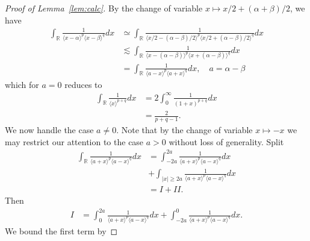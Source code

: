 \documentclass[12pt,reqno]{amsart}
\numberwithin{equation}{section}  %
\numberwithin{figure}{section}
\newcommand{\rr}{\mathbb{R}}
\begin{document}
\begin{proof}[Proof of Lemma~\ref{lem:calc}]
%
By the change of variable $x \mapsto x/2 + (\alpha + \beta)/2$, we have
%
%
\begin{equation}
  \label{rry}
	\begin{split}
    \int_{\rr} \frac{1}{\langle x - \alpha \rangle^{p} \langle  x -
    \beta
    \rangle^{q}}d x
    & \simeq \int_{\rr} \frac{1}{\langle x/2 - (\alpha - \beta)/2  \rangle^{p}
    \langle  x/2 + (\alpha - \beta)/2 \rangle^{q}} d x
    \\
    & \lesssim \int_{\rr} \frac{1}{\langle x - (\alpha - \beta)  \rangle^{p}
    \langle  x + (\alpha - \beta) \rangle^{q}} d x
  \\
  & = \int_{\rr} \frac{1}{\langle a - x \rangle ^{p} \langle a + x \rangle
  ^{q}} d x, \quad a = \alpha - \beta
\end{split}
\end{equation}
%
which for $a =0$ reduces to 
%
%
\begin{equation*}
\begin{split}
  \int_{\rr} \frac{1}{\langle x \rangle ^{p+q}} d x 
  & = 2 \int_{0}^{\infty} \frac{1}{(1 + x)^{p+q}} d x
  \\
  & = \frac{2}{p+q -1}.
\end{split}
\end{equation*}
%
%
We now handle the case $a \neq 0$. Note that by the change of variable $x \mapsto
-x$ we may restrict our attention to the case  $a > 0$ without loss of
generality. Split
%
%
\begin{equation*}
\begin{split}
\int_{\rr} \frac{1}{\langle a + x \rangle ^{p} \langle a - x \rangle
  ^{q}} d x
  & = \int_{-2a}^{2a}
  \frac{1}{\langle a + x \rangle ^{p} \langle a - x \rangle
  ^{q}} d x
  \\
  & + \int_{| x | \ge 2a} 
\frac{1}{\langle a + x \rangle ^{p} \langle a - x \rangle
  ^{q}} d x
  \\
  & = I + II.
\end{split}
\end{equation*}
%
%
Then
\begin{equation*}
\begin{split}
  I 
  & = \int_{0}^{2a}
  \frac{1}{\langle a + x \rangle ^{p} \langle a - x \rangle
  ^{q}} d x + \int_{-2a}^{0}
  \frac{1}{\langle a + x \rangle ^{p} \langle a - x \rangle
  ^{q}} d x.
\end{split}
\end{equation*}
We bound the first term by

\end{proof}
\end{document}
